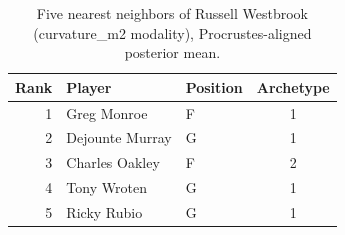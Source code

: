 \begin{table}[htbp]
  \centering\small
  \begin{tabular}{rllc}
    \toprule
    Rank & Player & Position & Archetype \\
    \midrule
    1 & Greg Monroe & F & 1 \\
    2 & Dejounte Murray & G & 1 \\
    3 & Charles Oakley & F & 2 \\
    4 & Tony Wroten & G & 1 \\
    5 & Ricky Rubio & G & 1 \\
    \bottomrule
  \end{tabular}
  \caption{Five nearest neighbors of Russell Westbrook (curvature_m2 modality), Procrustes-aligned posterior mean.}
  \label{tab:Russell_Westbrook_neighbors_curvature_m2}
\end{table}

